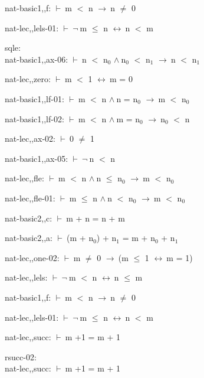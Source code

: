 \documentclass[a4paper]{article}
\newcommand{\Fol}{\mbox{$\vdash\ $}}
\newcommand{\Not}{\mbox{$\neg\ $}}
\newcommand{\And}{\mbox{$\wedge\ $}}
\newcommand{\Imp}{\mbox{$\rightarrow\ $}}
\newcommand{\Equiv}{\mbox{$\leftrightarrow\ $}}
\begin{document}
nat-basic1,,f: 
 \Fol m $<$ n \Imp n $\neq$ 0



nat-lec,,lels-01: 
 \Fol \Not m $\le$ n \Equiv n $<$ m



\bigskip

sqle:\\ nat-basic1,,ax-06: 
 \Fol n $<$ $\mbox{n}_{0}$ \And $\mbox{n}_{0}$ $<$ $\mbox{n}_{1}$ \Imp n $<$ $\mbox{n}_{1}$

nat-lec,,zero: 
 \Fol m $<$ 1 \Equiv m = 0



nat-basic1,,lf-01: 
 \Fol m $<$ n \And n = $\mbox{n}_{0}$ \Imp m $<$ $\mbox{n}_{0}$



nat-basic1,,lf-02: 
 \Fol m $<$ n \And m = $\mbox{n}_{0}$ \Imp $\mbox{n}_{0}$ $<$ n



nat-lec,,ax-02: 
 \Fol 0 $\neq$ 1



nat-basic1,,ax-05: 
 \Fol \Not n $<$ n



nat-lec,,fle: 
 \Fol m $<$ n \And n $\le$ $\mbox{n}_{0}$ \Imp m $<$ $\mbox{n}_{0}$



nat-lec,,fle-01: 
 \Fol m $\le$ n \And n $<$ $\mbox{n}_{0}$ \Imp m $<$ $\mbox{n}_{0}$



nat-basic2,,c: 
 \Fol m + n = n + m



nat-basic2,,a: 
 \Fol (m + $\mbox{n}_{0}$) + $\mbox{n}_{1}$ = m + $\mbox{n}_{0}$ + $\mbox{n}_{1}$



nat-lec,,one-02: 
 \Fol m $\neq$ 0 \Imp (m $\le$ 1 \Equiv m = 1)



nat-lec,,lels: 
 \Fol \Not m $<$ n \Equiv n $\le$ m



nat-basic1,,f: 
 \Fol m $<$ n \Imp n $\neq$ 0



nat-lec,,lels-01: 
 \Fol \Not m $\le$ n \Equiv n $<$ m



nat-lec,,succ: 
 \Fol m +1 = m + 1



\bigskip

rsucc-02:\\ nat-lec,,succ: 
 \Fol m +1 = m + 1
\end{document}
